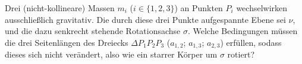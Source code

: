 \begin{minipage}[b]{0.7\textwidth}

\begin{Exercise}[label  = rotierendes 3-Körper-Problem, difficulty = 4, label = cmrot, origin = {XX. IPhO 1989}, title = Starrer Körper]
	Drei (nicht-kollineare) Massen $m_i$ ($i \in \{1,2,3\}$) an Punkten $P_i$ wechselwirken ausschließlich gravitativ. Die durch diese drei Punkte aufgespannte Ebene sei $\nu$, und die dazu senkrecht stehende Rotationsachse $\sigma$. Welche Bedingungen müssen die drei Seitenlängen des Dreiecks $\Delta P_1P_2P_3$ ($a_{1,2}$; $a_{1,3}$; $a_{2,3}$) erfüllen, sodass dieses sich nicht verändert, also wie ein starrer Körper um $\sigma$ rotiert?
\end{Exercise}
\end{minipage}
\begin{minipage}[b]{0.3\textwidth}
	\centering
{}
\end{minipage}
